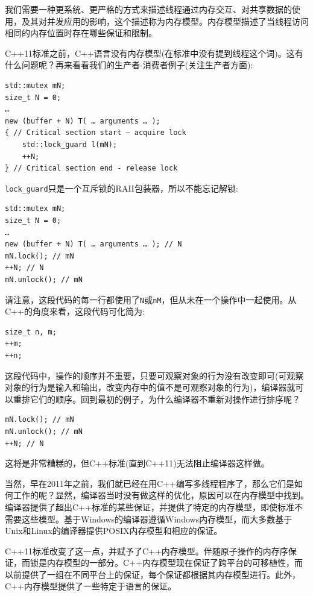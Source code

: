 我们需要一种更系统、更严格的方式来描述线程通过内存交互、对共享数据的使用，及其对并发应用的影响，这个描述称为内存模型。内存模型描述了当线程访问相同的内存位置时存在哪些保证和限制。

C++11标准之前，C++语言没有内存模型(在标准中没有提到线程这个词)。这有什么问题呢？再来看看我们的生产者-消费者例子(关注生产者方面):

\begin{lstlisting}[style=styleCXX]
std::mutex mN;
size_t N = 0;
…
new (buffer + N) T( … arguments … );
{ // Critical section start – acquire lock
	std::lock_guard l(mN);
	++N;
} // Critical section end - release lock
\end{lstlisting}

\texttt{lock\_guard}只是一个互斥锁的RAII包装器，所以不能忘记解锁:

\begin{lstlisting}[style=styleCXX]
std::mutex mN;
size_t N = 0;
…
new (buffer + N) T( … arguments … ); // N
mN.lock(); // mN
++N; // N
mN.unlock(); // mN
\end{lstlisting}

请注意，这段代码的每一行都使用了\texttt{N}或\texttt{nM}，但从未在一个操作中一起使用。从C++的角度来看，这段代码可化简为:

\begin{lstlisting}[style=styleCXX]
size_t n, m;
++m;
++n;
\end{lstlisting}

这段代码中，操作的顺序并不重要，只要可观察对象的行为没有改变即可(可观察对象的行为是输入和输出，改变内存中的值不是可观察对象的行为)，编译器就可以重排它们的顺序。回到最初的例子，为什么编译器不重新对操作进行排序呢？

\begin{lstlisting}[style=styleCXX]
mN.lock(); // mN
mN.unlock(); // mN
++N; // N
\end{lstlisting}

这将是非常糟糕的，但C++标准(直到C++11)无法阻止编译器这样做。

当然，早在2011年之前，我们就已经在用C++编写多线程程序了，那么它们是如何工作的呢？显然，编译器当时没有做这样的优化，原因可以在内存模型中找到。编译器提供了超出C++标准的某些保证，并提供了特定的内存模型，即使标准不需要这些模型。基于Windows的编译器遵循Windows内存模型，而大多数基于Unix和Linux的编译器提供POSIX内存模型和相应的保证。

C++11标准改变了这一点，并赋予了C++内存模型。伴随原子操作的内存序保证，而锁是内存模型的一部分。C++内存模型现在保证了跨平台的可移植性，而以前提供了一组在不同平台上的保证，每个保证都根据其内存模型进行。此外，C++内存模型提供了一些特定于语言的保证。


